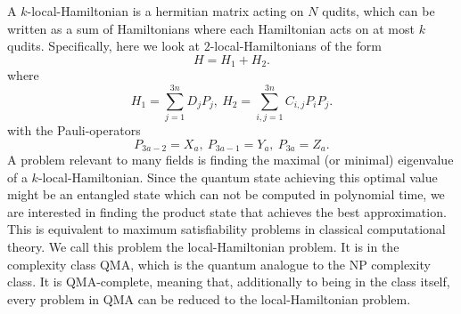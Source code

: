 A $k$-local-Hamiltonian is a hermitian matrix acting on $N$ qudits, which can be written as a sum of Hamiltonians where each Hamiltonian acts on at most $k$ qudits.
Specifically, here we look at  $2$-local-Hamiltonians of the form \[
H = H_1+H_2
.\]
where \[
	H_1 = \sum_{j=1}^{3n} D_jP_j, ~ H_2  = \sum_{i,j=1}^{3n} C_{i,j}P_iP_j
.\]
with the Pauli-operators \[
	P_{3a-2}=X_a, ~ P_{3a-1}=Y_a, ~ P_{3a}=Z_a
.\]
A problem relevant to many fields is finding the maximal (or minimal) eigenvalue of a $k$-local-Hamiltonian.
Since the quantum state achieving this optimal value might be an entangled state which can not be computed in polynomial time, we are interested in finding the product state that achieves the best approximation.
This is equivalent to maximum satisfiability problems in classical computational theory.
We call this problem the local-Hamiltonian problem.
It is in the complexity class QMA, which is the quantum analogue to the NP complexity class.
It is QMA-complete, meaning that, additionally to being in the class itself, every problem in QMA can be reduced to the local-Hamiltonian problem.
